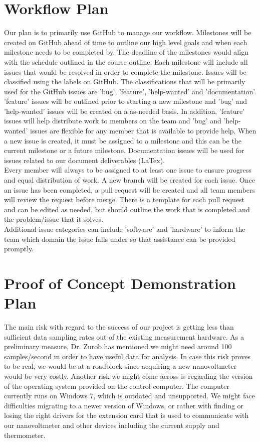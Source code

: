 \documentclass{article}
\begin{document}
\section{Workflow Plan}

\noindent Our plan is to primarily use GitHub to manage our workflow. 
Milestones will be created on GitHub ahead of time to outline our high level goals and when each milestone needs to be completed by.
The deadline of the milestones would align with the schedule outlined in the course outline.
Each milestone will include all issues that would be resolved in order to complete the milestone. 
Issues will be classified using the labels on GitHub. The classifications that will be primarily used for the 
GitHub issues are 'bug', 'feature', 'help-wanted' and 'documentation'. 'feature' issues will be outlined prior to starting a 
new milestone and 'bug' and 'help-wanted' issues will be created on a as-needed basis. In addition, 'feature' issues will help distribute work to 
members on the team and 'bug' and 'help-wanted' issues are flexible for any member that is available to provide help. 
When a new issue is created, it must be assigned to a milestone and this can be the current milestone or a future milestone.
Documentation issues will be used for issues related to our document deliverables (LaTex). \\

\noindent Every member will always to be assigned to at least one issue to ensure progress and equal distribution of work.
A new branch will be created for each issue. Once an issue has been completed, 
a pull request will be created and all team members will review the request before merge. 
There is a template for each pull request and can be edited as needed, but should outline the work that is completed
and the problem/issue that it solves. \\

\noindent Additional issue categories can include 'software' and 'hardware' to inform the team which domain the issue falls under so 
that assistance can be provided promptly.

\section{Proof of Concept Demonstration Plan}


\noindent The main risk with regard to the success of our project is getting less than sufficient data sampling rates out of the existing measurement hardware. As a preliminary measure, Dr. Zurob has mentioned we might need around 100 samples/second in order to have useful data for analysis. In case this risk proves to be real, we would be at a roadblock since acquiring a new nanovoltmeter would be very costly.
\noindent Another risk we might come across is regarding the version of the operating system provided on the control computer. The computer currently runs on Windows 7, which is outdated and unsupported. We might face difficulties migrating to a newer version of Windows, or rather with finding or losing the right drivers for the extension card that is used to communicate with our nanovoltmeter and other devices including the current supply and thermometer. \\
\end{document}
